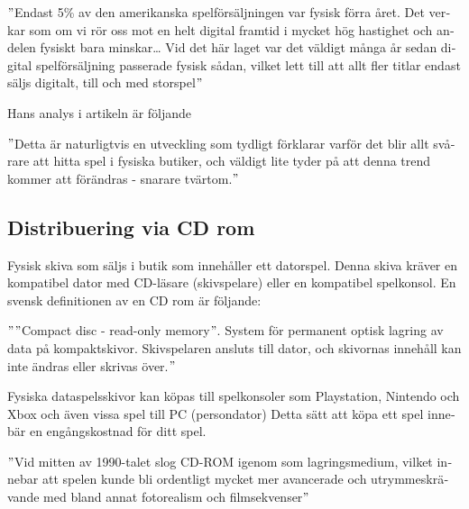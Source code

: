 \documentclass[11p]{article}
\begin{document}
\begin{otherlanguage}{swedish}
        \setlength{\leftskip}{1cm}

        \("\)Endast 5\% av den amerikanska spelförsäljningen var fysisk förra året.
        Det verkar som om vi rör oss mot en helt digital framtid i mycket hög hastighet och andelen fysiskt bara minskar\dots
        Vid det här laget var det väldigt många år sedan digital spelförsäljning passerade fysisk sådan, vilket lett till att allt fler titlar endast säljs digitalt, till och med storspel\("\)

        \setlength{\leftskip}{0cm}

        Hans analys i artikeln är följande

        \setlength{\leftskip}{1cm}

        \("\)Detta är naturligtvis en utveckling som tydligt förklarar varför det blir allt svårare att hitta spel i fysiska butiker, och väldigt lite tyder på att denna trend kommer att förändras - snarare tvärtom.\("\)\parencite{amerikanska}

        \setlength{\leftskip}{0cm}

    \subsection{Distribuering via CD rom}
    Fysisk skiva som säljs i butik som innehåller ett datorspel.
    Denna skiva kräver en kompatibel dator med CD-läsare (skivspelare)  eller en kompatibel spelkonsol.
    En svensk definitionen av en CD rom är följande:

    \setlength{\leftskip}{1cm}

    \("\)\("\)Compact disc - read-only memory\("\).
    System för permanent optisk lagring av data på kompaktskivor.
    Skivspelaren ansluts till dator, och skivornas innehåll kan inte ändras eller skrivas över.\("\) \parencite{CD}

    \setlength{\leftskip}{0cm}

    Fysiska dataspelsskivor kan köpas till spelkonsoler som Playstation, Nintendo och Xbox och även vissa spel till PC (persondator)
    Detta sätt att köpa ett spel innebär en engångskostnad för ditt spel.

    \setlength{\leftskip}{1cm}

    \("\)Vid mitten av 1990-talet slog CD-ROM igenom som lagringsmedium, vilket innebar att spelen kunde bli ordentligt mycket mer avancerade och utrymmeskrävande med bland annat fotorealism och filmsekvenser\("\) \parencite{nyckel}

    \setlength{\leftskip}{0cm}


\end{otherlanguage}
\end{document}
